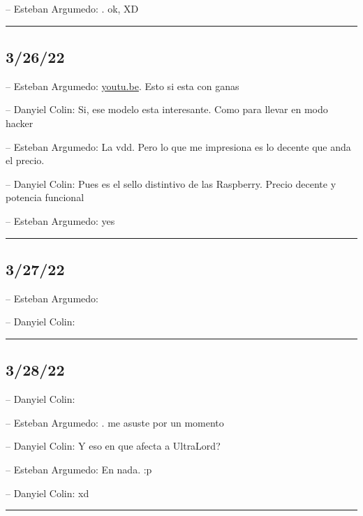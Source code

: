 -- Esteban Argumedo: . ok, XD

\begin{center}\rule{0.5\linewidth}{0.5pt}\end{center}

\hypertarget{section-39}{%
\subsection{3/26/22}\label{section-39}}

-- Esteban Argumedo: \href{https://youtu.be/C1Dpz35HLOI}{youtu.be}. Esto
si esta con ganas

-- Danyiel Colin: Si, ese modelo esta interesante. Como para llevar en
modo hacker

-- Esteban Argumedo: La vdd. Pero lo que me impresiona es lo decente que
anda el precio.

-- Danyiel Colin: Pues es el sello distintivo de las Raspberry. Precio
decente y potencia funcional

-- Esteban Argumedo: yes

\begin{center}\rule{0.5\linewidth}{0.5pt}\end{center}

\hypertarget{section-40}{%
\subsection{3/27/22}\label{section-40}}

-- Esteban Argumedo:

-- Danyiel Colin:

\begin{center}\rule{0.5\linewidth}{0.5pt}\end{center}

\hypertarget{section-41}{%
\subsection{3/28/22}\label{section-41}}

-- Danyiel Colin:

-- Esteban Argumedo: . me asuste por un momento

-- Danyiel Colin: Y eso en que afecta a UltraLord?

-- Esteban Argumedo: En nada. :p

-- Danyiel Colin: xd

\begin{center}\rule{0.5\linewidth}{0.5pt}\end{center}

